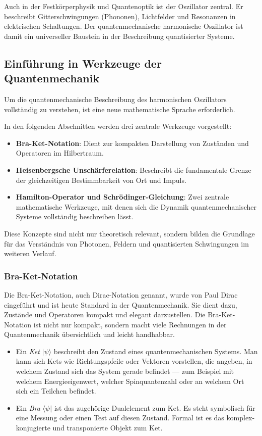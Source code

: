 	Auch in der Festkörperphysik und Quantenoptik ist der Oszillator zentral.
	Er beschreibt Gitterschwingungen (Phononen), Lichtfelder und Resonanzen in elektrischen Schaltungen.
	Der quantenmechanische harmonische Oszillator ist damit ein universeller Baustein in der Beschreibung quantisierter Systeme.

\subsection{Einführung in Werkzeuge der Quantenmechanik\label{fourier:subsection:werkzeugeQuantenmechanik}}
	Um die quantenmechanische Beschreibung des harmonischen Oszillators vollständig zu verstehen, ist eine neue mathematische Sprache erforderlich.
	
	In den folgenden Abschnitten werden drei zentrale Werkzeuge vorgestellt:
	\begin{itemize}
	\item \textbf{Bra-Ket-Notation}:
	Dient zur kompakten Darstellung von Zuständen und Operatoren im Hilbertraum.

	\item \textbf{Heisenbergsche Unschärferelation}:
	Beschreibt die fundamentale Grenze der gleichzeitigen Bestimmbarkeit von Ort und Impuls.

	\item \textbf{Hamilton-Operator und Schrödinger-Gleichung}:
	Zwei zentrale mathematische Werkzeuge, mit denen sich die Dynamik quantenmechanischer Systeme vollständig beschreiben lässt.
	\end{itemize}

	Diese Konzepte sind nicht nur theoretisch relevant, sondern bilden die Grundlage für das Verständnis von Photonen, Feldern und quantisierten Schwingungen im weiteren Verlauf.

	\subsubsection{Bra-Ket-Notation\label{fourier:subsubsection:braKetNotation}}
		Die Bra-Ket-Notation, auch Dirac-Notation genannt, wurde von Paul Dirac eingeführt und ist heute Standard in der Quantenmechanik.
		Sie dient dazu, Zustände und Operatoren kompakt und elegant darzustellen.
		Die Bra-Ket-Notation ist nicht nur kompakt, sondern macht viele Rechnungen in der Quantenmechanik übersichtlich und leicht handhabbar.

		\begin{itemize}
			\item Ein \emph{Ket} $|\psi\rangle$ beschreibt den Zustand eines quantenmechanischen Systems.
			Man kann sich Kets wie Richtungspfeile oder Vektoren vorstellen, die angeben, in welchem Zustand sich das System gerade befindet ---
			zum Beispiel mit welchem Energieeigenwert, welcher Spinquantenzahl oder an welchem Ort sich ein Teilchen befindet.
			\item Ein \emph{Bra} $\langle\psi|$ ist das zugehörige Dualelement zum Ket.
			Es steht symbolisch für eine Messung oder einen Test auf diesen Zustand.
			Formal ist es das komplex-konjugierte und transponierte Objekt zum Ket.
		\end{itemize}
		
